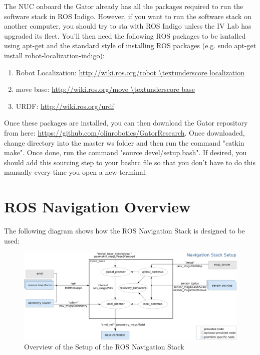 The NUC onboard the Gator already has all the packages required to run the software stack in ROS Indigo. However, if you want to run the software stack on another computer, you should try to sta with ROS Indigo unless the IV Lab has upgraded its fleet. You'll then need the following ROS packages to be isntalled using apt-get and the standard style of installing ROS packages (e.g. sudo apt-get install robot-localization-indigo):

\begin{enumerate}
\item Robot Localization: \url{http://wiki.ros.org/robot \textunderscore localization}
\item move base: \url{http://wiki.ros.org/move \textunderscore base}
\item URDF: \url{http://wiki.ros.org/urdf}
\end{enumerate}

\noindent Once these packages are installed, you can then download the Gator repository from here: \url{https://github.com/olinrobotics/GatorResearch}. Once downloaded, change directory into the master \textunderscore ws folder and then run the command "catkin \textunderscore make". Once done, run the command "source devel/setup.bash". If desired, you should add this sourcing step to your bashrc file so that you don't have to do this manually every time you open a new terminal.

\newpage

\section{ROS Navigation Overview}

The following diagram shows how the ROS Navigation Stack is designed to be used:

\begin{figure}[h!]
\centering
\includegraphics[scale=.35]{Photos/rosnavoverview.png}
\caption{Overview of the Setup of the ROS Navigation Stack}
\label{fig:rosnavoverview}
\end{figure} 

